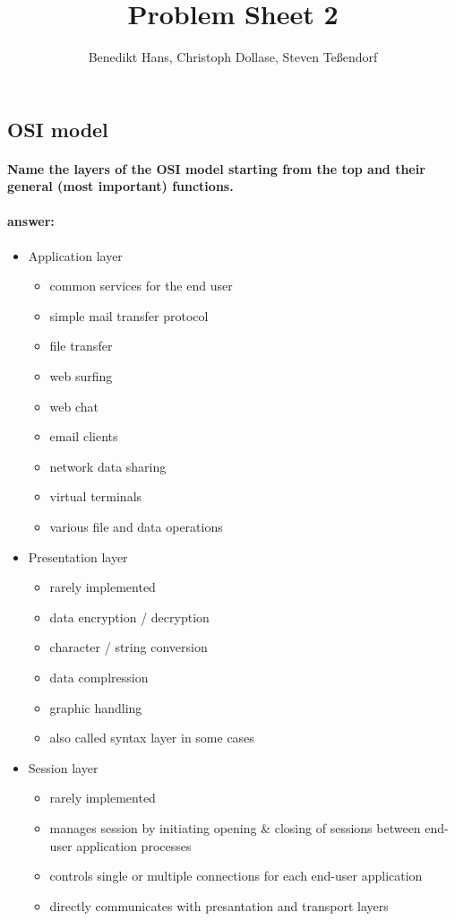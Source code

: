 \documentclass[a4paper,12pt]{article}
\author{Benedikt Hans, Christoph Dollase, Steven Teßendorf}
\title{ \textbf{Problem Sheet 2}}
\begin{document}
	 
 \maketitle	 
 
 \subsection{OSI model}
 \paragraph{Name the layers of the OSI model starting from the top and their general (most important) functions.}
 \paragraph{answer:}
\begin{itemize}
	\item Application layer
	\begin{itemize}
		\item common services for the end user
		\item simple mail transfer protocol
		\item file transfer
		\item web surfing
		\item web chat
		\item email clients
		\item network data sharing
		\item virtual terminals
		\item various file and data operations 
	\end{itemize}

	\item Presentation layer
	\begin{itemize}
		\item  rarely implemented
		\item  data encryption / decryption
		\item  character / string conversion
		\item  data complression
		\item  graphic handling
		\item  also called syntax layer in some cases
	\end{itemize}

	\item Session layer
	\begin{itemize}
		\item  rarely implemented
		\item  manages session by initiating opening \& closing of sessions between end-user application processes
		\item  controls single or multiple connections for each end-user application
		\item  directly communicates with presantation and transport layers
	\end{itemize}


\end{itemize}
\end{document}

